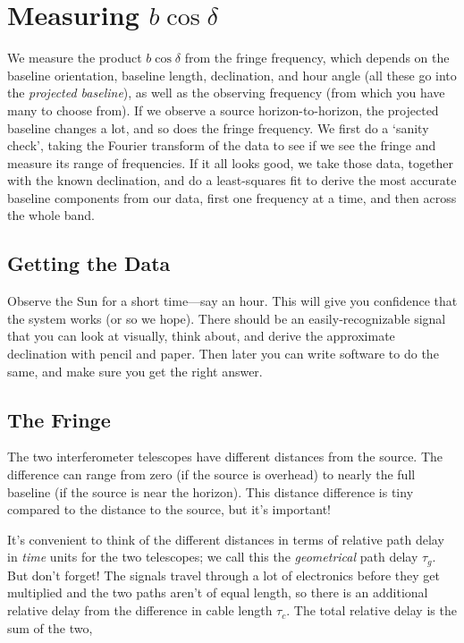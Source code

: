 \documentclass[11pt,preprint]{aastex}
\begin{document}
\section {Measuring $b \cos \delta$} \label{declinations}

\noindent
We measure the product $b \cos \delta$ from the fringe frequency, which
depends on the baseline orientation, baseline length, declination, and
hour angle (all these go into the {\it projected baseline}), as well
as the observing frequency (from which you have many to choose from). If we
observe a source horizon-to-horizon, the projected baseline changes a
lot, and so does the fringe frequency. We first do a `sanity check',
taking the Fourier transform of the data to see if we see the fringe and
measure its range of frequencies. If it all looks good, we take those
data, together with the known declination, and do a least-squares fit to
derive the most accurate baseline components
from our data, first one frequency at a time, and then across the whole band.

\subsection{Getting the Data}

\noindent
Observe
the Sun for a short time---say an hour. This will give you
confidence that the system works (or so we hope). There should be an
easily-recognizable signal that you can look at visually, think about,
and derive the approximate declination with pencil and paper. Then later
you can write software to do the same, and make sure you get the right
answer.

\subsection{The Fringe} \label{details}

\noindent
	The two interferometer telescopes have different distances from
the source. The difference can range from zero (if the source is
overhead) to nearly the full baseline (if the source is near the
horizon). This distance difference is tiny compared to the distance to
the source, but it's important! 

	It's convenient to think of the different distances in terms of 
relative path delay in {\it time} units for the two telescopes; we call
this the {\it geometrical} path delay $\tau_g$.  But don't forget! The
signals travel through a lot of electronics before they get multiplied
and the two paths aren't of equal length, so there is an additional
relative delay from the difference in cable length $\tau_c$.  The total
relative delay is the sum of the two,
\end{document}
